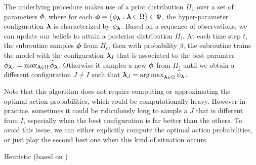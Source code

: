 \documentclass[twoside,11pt]{article}
\begin{document}
The underlying procedure \TTTS makes use of a prior distribution $\Pi_1$ over a set of parameters $\Phi$, where for each ${\boldsymbol \phi}=\{\phi_{{\boldsymbol \lambda}}:{\boldsymbol \lambda}\in\Omega\}\in\Phi$, the hyper-parameter configuration ${\boldsymbol \lambda}$ is characterized by $\phi_{{\boldsymbol \lambda}}$. Based on a sequence of observations, we can update our beliefs to attain a posterior distribution $\Pi_t$. At each time step $t$, the subroutine samples ${\boldsymbol \phi}$ from $\Pi_t$, then with probability $\beta$, the subroutine trains the model with the configuration ${\boldsymbol \lambda}_I$ that is associated to the best paramter $\phi_{{\boldsymbol \lambda}_I} = \max_{{\boldsymbol \lambda}\in\Omega}\widehat{\phi}_{{\boldsymbol \lambda}}$. Otherwise it samples a new ${\boldsymbol \phi}$ from $\Pi_t$ until we obtain a different configuration $J\neq I$ such that ${\boldsymbol \lambda}_J = \operatorname*{arg\,max}_{{\boldsymbol \lambda}\in\Omega}\widehat{\phi}_{{\boldsymbol \lambda}}$.

\begin{remark}
Note that this algorithm does not require computing or approximating the optimal action probabilities, which could be computationally heavy. However in practice, sometimes it could be ridiculously long to sample a $J$ that is different from $I$, especially when the best configuration is far better than the others. To avoid this issue, we can either explicitly compute the optimal action probabilities, or just play the second best one when this kind of situation occurs.
\end{remark}

\begin{algorithm}[h]

\caption{Heuristic (based on \TTTS)\label{heuristic1}}
\end{algorithm}
\end{document}
